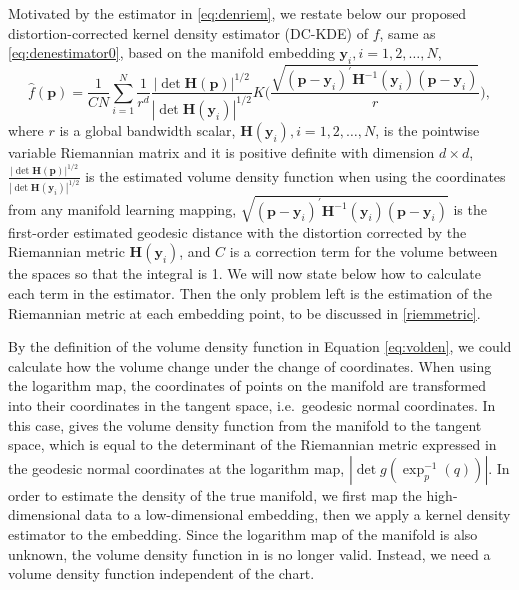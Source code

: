 \documentclass[11pt,a4paper,]{article}
\begin{document}
Motivated by the estimator in \eqref{eq:denriem}, we restate below our proposed distortion-corrected kernel density estimator (DC-KDE) of \(f\), same as \eqref{eq:denestimator0}, based on the manifold embedding \(\pmb{y}_i, i = 1, 2, \dots, N\),
\begin{equation}
\label{eq:denestimator}
\hat{f}(\pmb{p}) = \frac{1}{CN} \sum_{i=1}^{N} \frac{1}{r^d} \frac{|\det \pmb{H}(\pmb{p})|^{1/2}}{|\det \pmb{H}(\pmb{y}_i)|^{1/2}} K\bigg( \frac{ \sqrt{(\pmb{p} - \pmb{y}_i)^\prime \pmb{H}^{-1}(\pmb{y}_i) (\pmb{p} - \pmb{y}_i)} }{r} \bigg),
\end{equation}
where \(r\) is a global bandwidth scalar, \(\pmb{H}(\pmb{y}_i), i = 1, 2, \dots, N\), is the pointwise variable Riemannian matrix and it is positive definite with dimension \(d\times d\), \(\frac{|\det \pmb{H}(\pmb{p})|^{1/2}}{|\det \pmb{H}(\pmb{y}_i)|^{1/2}}\) is the estimated volume density function when using the coordinates from any manifold learning mapping, \(\sqrt{(\pmb{p} - \pmb{y}_i)^\prime \pmb{H}^{-1}(\pmb{y}_i) (\pmb{p} - \pmb{y}_i)}\) is the first-order estimated geodesic distance with the distortion corrected by the Riemannian metric \(\pmb{H}(\pmb{y}_i)\), and \(C\) is a correction term for the volume between the spaces so that the integral is 1. We will now state below how to calculate each term in the estimator. Then the only problem left is the estimation of the Riemannian metric at each embedding point, to be discussed in \autoref{riemmetric}.

By the definition of the volume density function in Equation \eqref{eq:volden}, we could calculate how the volume change under the change of coordinates. When using the logarithm map, the coordinates of points on the manifold are transformed into their coordinates in the tangent space, i.e.~geodesic normal coordinates. In this case, \textcite{Pelletier2005-vu} gives the volume density function from the manifold to the tangent space, which is equal to the determinant of the Riemannian metric expressed in the geodesic normal coordinates at the logarithm map, \(|\det g(\exp^{-1}_p(q)) |\).
In order to estimate the density of the true manifold, we first map the high-dimensional data to a low-dimensional embedding, then we apply a kernel density estimator to the embedding. Since the logarithm map of the manifold is also unknown, the volume density function in \textcite{Pelletier2005-vu} is no longer valid. Instead, we need a volume density function independent of the chart.
\end{document}
